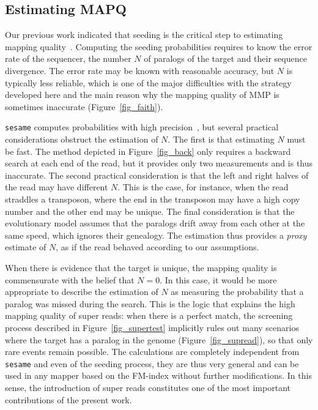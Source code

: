 \documentclass[a4,center,fleqn]{NAR}
\begin{document}
\subsection{Estimating MAPQ}

Our previous work indicated that seeding is the critical step to
estimating mapping quality~\cite{Filion619155}. Computing the seeding
probabilities requires to know the error rate of the sequencer, the number
$N$ of paralogs of the target and their sequence divergence. The error
rate may be known with reasonable accuracy, but $N$ is typically less
reliable, which is one of the major difficulties with the strategy
developed here and the main reason why the mapping quality of MMP is
sometimes inaccurate (Figure~\ref{fig_faith}).

\texttt{sesame} computes probabilities with high
precision~\cite{Filion619155}, but several practical considerations
obstruct the estimation of $N$. The first is that estimating $N$ must be
fast. The method depicted in Figure~\ref{fig_back} only requires a
backward search at each end of the read, but it provides only two
measurements and is thus inaccurate. The second practical consideration is
that the left and right halves of the read may have different $N$. This is
the case, for instance, when the read straddles a transposon, where the
end in the transposon may have a high copy number and the other end may be
unique. The final consideration is that the evolutionary model assumes
that the paralogs drift away from each other at the same speed, which
ignores their genealogy. The estimation thus provides a \emph{proxy}
estimate of $N$, as if the read behaved according to our assumptions.

When there is evidence that the target is unique, the mapping quality is
commensurate with the belief that $N = 0$. In this case, it would be more
appropriate to describe the estimation of $N$ as measuring the probability
that a paralog was missed during the search. This is the logic that
explains the high mapping quality of super reads: when there is a perfect
match, the screening process described in Figure~\ref{fig_supertest}
implicitly rules out many scenarios where the target has a paralog in the
genome (Figure~\ref{fig_supread}), so that only rare events remain
possible. The calculations are completely independent from \texttt{sesame}
and even of the seeding process, they are thus very general and can be
used in any mapper based on the FM-index without further modifications. In
this sense, the introduction of super reads constitutes one of the most
important contributions of the present work.
\end{document}
